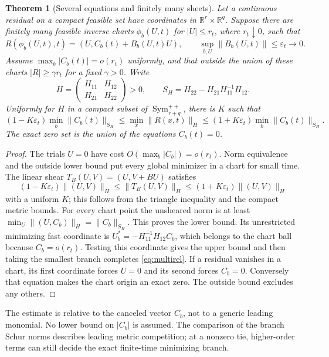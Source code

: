 \documentclass[11pt,reqno]{amsart}
\numberwithin{equation}{section}
\newtheorem{theorem}{Theorem}[section]
\theoremstyle{definition}
\theoremstyle{remark}
\newcommand{\R}{\mathbb R}
\newcommand{\Sym}{\operatorname{Sym}}
\newcommand{\eps}{\varepsilon}
\begin{document}
\begin{theorem}[Several equations and finitely many sheets]\label{thm:shear}
Let a continuous residual on a compact feasible set have coordinates in $\R^r\times\R^q$. Suppose there are finitely many feasible inverse charts $\phi_b(U,t)$ for $|U|\le r_t$, where $r_t\downarrow0$, such that
\begin{equation}\label{eq:shear}
 R(\phi_b(U,t),t)=(U,C_b(t)+B_b(U,t)U),\qquad
 \sup_{b,U}\|B_b(U,t)\|\le\eps_t\longrightarrow0.
\end{equation}
Assume $\max_b|C_b(t)|=o(r_t)$ uniformly, and that outside the union of these charts $|R|\ge\gamma r_t$ for a fixed $\gamma>0$. Write
\[
 H=\begin{pmatrix}H_{11}&H_{12}\\H_{21}&H_{22}\end{pmatrix}>0,
 \qquad S_H=H_{22}-H_{21}H_{11}^{-1}H_{12}.
\]
Uniformly for $H$ in a compact subset of $\Sym_{r+q}^{++}$, there is $K$ such that
\begin{equation}\label{eq:multirel}
 (1-K\eps_t)\min_b\|C_b(t)\|_{S_H}
 \le \min_x\|R(x,t)\|_H
 \le(1+K\eps_t)\min_b\|C_b(t)\|_{S_H}.
\end{equation}
The exact zero set is the union of the equations $C_b(t)=0$.
\end{theorem}
\begin{proof}
The trials $U=0$ have cost $O(\max_b|C_b|)=o(r_t)$. Norm equivalence and the outside lower bound put every global minimizer in a chart for small time. The linear shear
$T_B(U,V)=(U,V+BU)$ satisfies
\[
 (1-K\eps_t)\|(U,V)\|_H\le\|T_B(U,V)\|_H
 \le(1+K\eps_t)\|(U,V)\|_H
\]
with a uniform $K$; this follows from the triangle inequality and the compact metric bounds. For every chart point the unsheared norm is at least
$\min_U\|(U,C_b)\|_H=\|C_b\|_{S_H}$. This proves the lower bound. Its unrestricted minimizing fast coordinate is
$U_b^*=-H_{11}^{-1}H_{12}C_b$, which belongs to the chart ball because $C_b=o(r_t)$. Testing this coordinate gives the upper bound and then taking the smallest branch completes \eqref{eq:multirel}. If a residual vanishes in a chart, its first coordinate forces $U=0$ and its second forces $C_b=0$. Conversely that equation makes the chart origin an exact zero. The outside bound excludes any others.
\end{proof}
The estimate is relative to the canceled vector $C_b$, not to a generic leading monomial. No lower bound on $|C_b|$ is assumed. The comparison of the branch Schur norms describes leading metric competition; at a nonzero tie, higher-order terms can still decide the exact finite-time minimizing branch.
\end{document}
